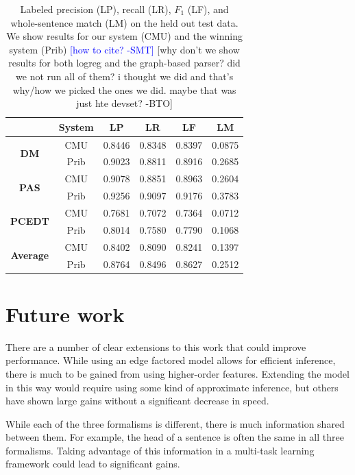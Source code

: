 \documentclass[11pt]{article}
\newcommand{\bocomment}[1]{\textcolor{Bittersweet}{[#1 -BTO]}}
\newcommand{\sam}[1]{\textcolor{blue}{[#1 -SMT]}}
\begin{document}
\begin{table}
\begin{center}
\begin{tabular*}{\textwidth}%
{@{\extracolsep{\fill}}cc|cccc}%
 & System & LP & LR & LF & LM \\
\hline
\hline
\multirow{2}{*}{\textbf{DM}}
& CMU & 0.8446 & 0.8348 & 0.8397 & 0.0875 \\
& Prib & 0.9023 & 0.8811 & 0.8916 & 0.2685 \\
\hline
\multirow{2}{*}{\textbf{PAS}}
& CMU & 0.9078 & 0.8851 & 0.8963 & 0.2604 \\
& Prib & 0.9256 & 0.9097 & 0.9176 & 0.3783 \\
\hline
\multirow{2}{*}{\textbf{PCEDT}}
& CMU & 0.7681 & 0.7072 & 0.7364 & 0.0712 \\
& Prib & 0.8014 & 0.7580 & 0.7790 & 0.1068 \\
\hline
\hline
\multirow{2}{*}{\textbf{Average}}
& CMU & 0.8402 & 0.8090 & 0.8241 & 0.1397 \\
& Prib & 0.8764 & 0.8496 & 0.8627 & 0.2512 \\
\end{tabular*}
\caption{Labeled precision (LP), recall (LR), $F_1$ (LF), and
whole-sentence match (LM) on the held out test data.
We show results for our system (CMU) and the winning system (Prib) \sam{how to
cite?}
\bocomment{why don't we show results for both logreg and the graph-based parser? did we not run all of them? i thought we did and that's why/how we picked the ones we did. maybe that was just hte devset?}
}
\label{table:perf}
\end{center}
\end{table}



\section{Future work}
There are a number of clear extensions to this work that could improve performance. While using an edge factored model allows for efficient inference, there is much to be gained from using higher-order features. Extending the model in this way would require using some kind of approximate inference, but others have shown large gains without a significant decrease in speed. 

While each of the three formalisms is different, there is much information shared between them. For example, the head of a sentence is often the same in all three formalisms. Taking advantage of this information in a multi-task learning framework could lead to significant gains. 
\end{document}
